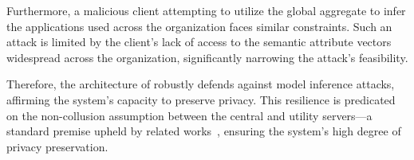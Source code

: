 Furthermore, a malicious client attempting to utilize the global aggregate to infer the applications used across the organization faces similar constraints. Such an attack is limited by the client's lack of access to the semantic attribute vectors widespread across the organization, significantly narrowing the attack's feasibility.

Therefore, the architecture of \Sys robustly defends against model inference attacks, affirming the system's capacity to preserve privacy. This resilience is predicated on the non-collusion assumption between the central and utility servers—a standard premise upheld by related works~\cite{roy2020crypte,wu2022federated}, ensuring the system's high degree of privacy preservation.
